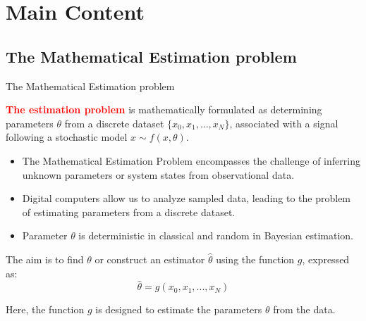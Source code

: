 \documentclass{beamer}
\begin{document}
\section{Main Content}


\subsection{The Mathematical Estimation problem}

\begin{frame}{The Mathematical Estimation problem}

  {\textcolor{red}{\textbf{The estimation problem}}} is mathematically formulated as determining parameters \(\theta\) from a discrete dataset \(\{x_0, x_1, ..., x_N\}\),
  associated with a signal following a stochastic model \( x \sim f(x, \theta) \)\cite{luLearningNonlinearOperators2021a,majumdarAutoencoderBasedFormulation2018}. 

  \vspace{10pt}

   \begin{itemize}
    \item The Mathematical Estimation Problem encompasses the challenge of inferring unknown parameters or system states from observational data. 
    \item Digital computers allow us to analyze sampled data, leading to the problem of estimating parameters from a discrete dataset.
    \item Parameter \(\theta\) is deterministic in classical and random in Bayesian estimation.
  \end{itemize}


   \vspace{10pt}

   The aim is to find \(\theta\) or construct an estimator \(\hat{\theta}\) using the function \( g \), expressed as:
  \[
  \hat{\theta} = g(x_0, x_1, ..., x_N)
  \]
  
  Here, the function \( g \) is designed to estimate the parameters \(\theta\) from the data.
\end{frame}
\end{document}
